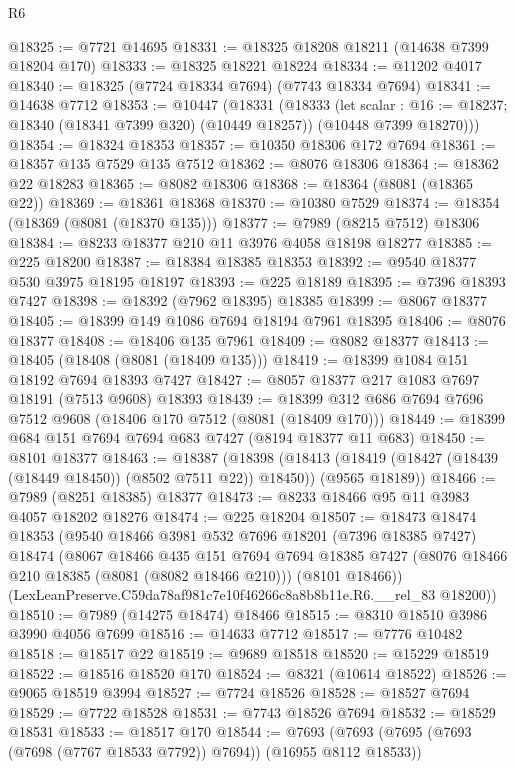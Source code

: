 \begin{lexlean}{R6}
\begin{coremodule}
@18325 := @7721 @14695
@18331 := @18325 @18208 @18211 (@14638 @7399 @18204 @170)
@18333 := @18325 @18221 @18224
@18334 := @11202 @4017
@18340 := @18325 (@7724 @18334 @7694) (@7743 @18334 @7694)
@18341 := @14638 @7712
@18353 := @10447
    (@18331
      (@18333
        (let scalar : @16 := @18237; @18340 (@18341 @7399 @320) (@10449 @18257))
        (@10448 @7399 @18270)))
@18354 := @18324 @18353
@18357 := @10350 @18306 @172 @7694
@18361 := @18357 @135 @7529 @135 @7512
@18362 := @8076 @18306
@18364 := @18362 @22 @18283
@18365 := @8082 @18306
@18368 := @18364 (@8081 (@18365 @22))
@18369 := @18361 @18368
@18370 := @10380 @7529
@18374 := @18354 (@18369 (@8081 (@18370 @135)))
@18377 := @7989 (@8215 @7512) @18306
@18384 := @8233 @18377 @210 @11 @3976 @4058 @18198 @18277
@18385 := @225 @18200
@18387 := @18384 @18385 @18353
@18392 := @9540 @18377 @530 @3975 @18195 @18197
@18393 := @225 @18189
@18395 := @7396 @18393 @7427
@18398 := @18392 (@7962 @18395) @18385
@18399 := @8067 @18377
@18405 := @18399 @149 @1086 @7694 @18194 @7961 @18395
@18406 := @8076 @18377
@18408 := @18406 @135 @7961
@18409 := @8082 @18377
@18413 := @18405 (@18408 (@8081 (@18409 @135)))
@18419 := @18399 @1084 @151 @18192 @7694 @18393 @7427
@18427 := @8057 @18377 @217 @1083 @7697 @18191 (@7513 @9608) @18393
@18439 := @18399 @312 @686 @7694 @7696 @7512 @9608 (@18406 @170 @7512 (@8081 (@18409 @170)))
@18449 := @18399 @684 @151 @7694 @7694 @683 @7427 (@8194 @18377 @11 @683)
@18450 := @8101 @18377
@18463 := @18387
    (@18398
      (@18413 (@18419 (@18427 (@18439 (@18449 @18450)) (@8502 @7511 @22)) @18450))
      (@9565 @18189))
@18466 := @7989 (@8251 @18385) @18377
@18473 := @8233 @18466 @95 @11 @3983 @4057 @18202 @18276
@18474 := @225 @18204
@18507 := @18473
    @18474
    @18353
    (@9540
      @18466
      @3981
      @532
      @7696
      @18201
      (@7396 @18385 @7427)
      @18474
      (@8067
        @18466
        @435
        @151
        @7694
        @7694
        @18385
        @7427
        (@8076 @18466 @210 @18385 (@8081 (@8082 @18466 @210)))
        (@8101 @18466))
      (LexLeanPreserve.C59da78af981c7e10f46266c8a8b8b11e.R6.__rel_83 @18200))
@18510 := @7989 (@14275 @18474) @18466
@18515 := @8310 @18510 @3986 @3990 @4056 @7699
@18516 := @14633 @7712
@18517 := @7776 @10482
@18518 := @18517 @22
@18519 := @9689 @18518
@18520 := @15229 @18519
@18522 := @18516 @18520 @170
@18524 := @8321 (@10614 @18522)
@18526 := @9065 @18519 @3994
@18527 := @7724 @18526
@18528 := @18527 @7694
@18529 := @7722 @18528
@18531 := @7743 @18526 @7694
@18532 := @18529 @18531
@18533 := @18517 @170
@18544 := @7693 (@7693 (@7695 (@7693 (@7698 (@7767 @18533 @7792)) @7694)) (@16955 @8112 @18533))

\end{coremodule}
\end{lexlean}
